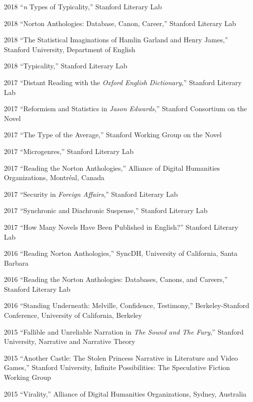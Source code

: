 \documentclass[12pt,letterpaper]{report}
\begin{document}
\begin{tablist}
	\item[2018] \tab{}\enquote{\emph{n} Types of Typicality,} Stanford Literary Lab
	\item[2018] \tab{}\enquote{Norton Anthologies: Database, Canon, Career,} Stanford Literary Lab
	\item[2018] \tab{}\enquote{The Statistical Imaginations of Hamlin Garland and Henry James,} Stanford University, Department of English
	\item[2018] \tab{}\enquote{Typicality,} Stanford Literary Lab
	\item[2017] \tab{}\enquote{Distant Reading with the \emph{Oxford English Dictionary},} Stanford Literary Lab
	\item[2017] \tab{}\enquote{Reformism and Statistics in \emph{Jason Edwards},} Stanford Consortium on the Novel
	\item[2017] \tab{}\enquote{The Type of the Average,} Stanford Working Group on the Novel
	\item[2017] \tab{}\enquote{Microgenres,} Stanford Literary Lab
	\item[2017] \tab{}\enquote{Reading the Norton Anthologies,} Alliance of Digital Humanities Organizations, Montréal, Canada
	\item[2017] \tab{}\enquote{Security in \emph{Foreign Affairs},} Stanford Literary Lab
	\item[2017] \tab{}\enquote{Synchronic and Diachronic Suspense,} Stanford Literary Lab
	\item[2017] \tab{}\enquote{How Many Novels Have Been Published in English?} Stanford Literary Lab
	\item[2016] \tab{}\enquote{Reading Norton Anthologies,} SyncDH, University of California, Santa Barbara
	\item[2016] \tab{}\enquote{Reading the Norton Anthologies: Databases, Canons, and Careers,} Stanford Literary Lab
	\item[2016] \tab{}\enquote{Standing Underneath: Melville, Confidence, Testimony,} Berkeley-Stanford Conference, University of California, Berkeley
	\item[2015] \tab{}\enquote{Fallible and Unreliable Narration in \emph{The Sound and The Fury},} Stanford University, Narrative and Narrative Theory
	\item[2015] \tab{}\enquote{Another Castle: The Stolen Princess Narrative in Literature and Video Games,} Stanford University, Infinite Possibilities: The Speculative Fiction Working Group
	\item[2015] \tab{}\enquote{Virality,} Alliance of Digital Humanities Organizations, Sydney, Australia

\end{tablist}
\end{document}
